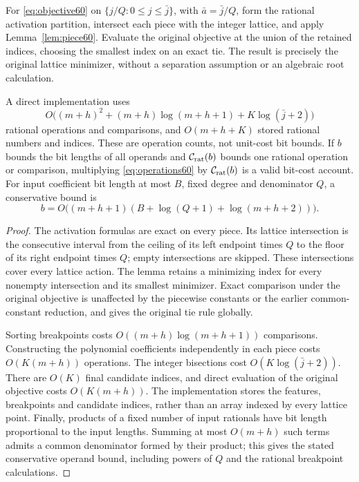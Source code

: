 \begin{theorem}\label{thm:rootfree60}
For \eqref{eq:objective60} on $\{j/Q:0\le j\le\bar j\}$, with $\bar a=\bar j/Q$, form the rational activation partition, intersect each piece with the integer lattice, and apply Lemma~\ref{lem:piece60}. Evaluate the original objective at the union of the retained indices, choosing the smallest index on an exact tie. The result is precisely the original lattice minimizer, without a separation assumption or an algebraic root calculation.

A direct implementation uses
\begin{equation}\label{eq:operations60}
 O\bigl((m+h)^2+(m+h)\log(m+h+1)+K\log(\bar j+2)\bigr)
\end{equation}
rational operations and comparisons, and $O(m+h+K)$ stored rational numbers and indices. These are operation counts, not unit-cost bit bounds. If $b$ bounds the bit lengths of all operands and $\mathcal C_{\rm rat}(b)$ bounds one rational operation or comparison, multiplying \eqref{eq:operations60} by $\mathcal C_{\rm rat}(b)$ is a valid bit-cost account. For input coefficient bit length at most $B$, fixed degree and denominator $Q$, a conservative bound is
\[
 b=O\bigl((m+h+1)(B+\log(Q+1)+\log(m+h+2))\bigr).
\]
\end{theorem}
\begin{proof}
The activation formulas are exact on every piece. Its lattice intersection is the consecutive interval from the ceiling of its left endpoint times $Q$ to the floor of its right endpoint times $Q$; empty intersections are skipped. These intersections cover every lattice action. The lemma retains a minimizing index for every nonempty intersection and its smallest minimizer. Exact comparison under the original objective is unaffected by the piecewise constants or the earlier common-constant reduction, and gives the original tie rule globally.

Sorting breakpoints costs $O((m+h)\log(m+h+1))$ comparisons. Constructing the polynomial coefficients independently in each piece costs $O(K(m+h))$ operations. The integer bisections cost $O(K\log(\bar j+2))$. There are $O(K)$ final candidate indices, and direct evaluation of the original objective costs $O(K(m+h))$. The implementation stores the features, breakpoints and candidate indices, rather than an array indexed by every lattice point. Finally, products of a fixed number of input rationals have bit length proportional to the input lengths. Summing at most $O(m+h)$ such terms admits a common denominator formed by their product; this gives the stated conservative operand bound, including powers of $Q$ and the rational breakpoint calculations.
\end{proof}

